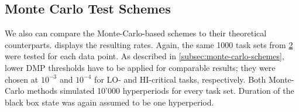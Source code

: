 \documentclass[a4paper,oneside]{csthesis}
\begin{document}
\begin{figure}[p]
    \begin{subfigure}[c]{\textwidth}
        \caption{}\label{subfig:eval-schemes-simplegen}
    \end{subfigure}
    \newline
    \newline
    \newline
    \begin{subfigure}[c]{\textwidth}
        \caption{}\label{subfig:eval-schemes-fairgen}
    \end{subfigure}
    \caption{}\label{fig:eval-schemes}
\end{figure}



\newpage
\subsection{Monte Carlo Test Schemes}
We also can compare the Monte-Carlo-based schemes to their theoretical counterparts.  displays the resulting rates. Again, the same 1000 task sets from \cref{subfig:eval-schemes-fairgen} were tested for each data point. As described in  \cref{subsec:monte-carlo-schemes}, lower DMP thresholds have to be applied for comparable results; they were chosen at $10^{-3}$ and $10^{-4}$ for LO- and HI-critical tasks, respectively. Both Monte-Carlo methods simulated 10'000 hyperperiods for every task set. Duration of the black box state was again assumed to be one hyperperiod.
\end{document}
